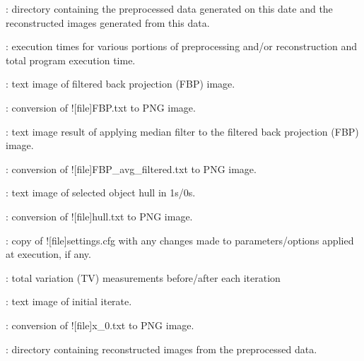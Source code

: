 \begin{tcbenvironment}
\begin{tcbenumbox}
\begin{ThinEnum}
\begin{ThinEnum}
\begin{ThinEnum}
\begin{ThinEnum}
\begin{ThinEnum}
\begin{ThinEnum}
\begin{ThinEnum}
\begin{ThinEnum}
                                    \item {} : directory containing the preprocessed data generated on this date and the reconstructed images generated from this data.
                                    \begin{ThinEnum}
                                            \item {} : execution times for various portions of preprocessing and/or reconstruction and total program execution time.
                                            \item {} : text image of filtered back projection (FBP) image.
                                            \item {} : conversion of \docentry![file]{FBP.txt} to PNG image.
                                            \item {} : text image result of applying median filter to the filtered back projection (FBP) image.
                                            \item {} : conversion of \docentry![file]{FBP\_avg\_filtered.txt} to PNG image.
                                            \item {} : text image of selected object hull in 1s/0s.
                                            \item {} : conversion of \docentry![file]{hull.txt} to PNG image.
                                            \item {} : copy of \docentry![file]{settings.cfg} with any changes made to parameters/options applied at execution, if any.
                                            \item {} : total variation (TV) measurements before/after each iteration
                                            \item {} : text image of initial iterate.
                                            \item {} : conversion of \docentry![file]{x\_0.txt} to PNG image.
                                            \item {} : directory containing reconstructed images from the preprocessed data.

\end{ThinEnum}
\end{ThinEnum}
\end{ThinEnum}
\end{ThinEnum}
\end{ThinEnum}
\end{ThinEnum}
\end{ThinEnum}
\end{ThinEnum}
\end{ThinEnum}
\end{tcbenumbox}
\end{tcbenvironment}
